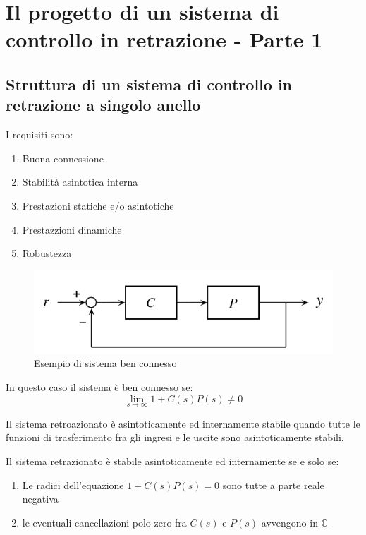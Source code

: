 \section{Il progetto di un sistema di controllo in retrazione - Parte 1}

\subsection{Struttura di un sistema di controllo in retrazione a singolo anello}
I requisiti sono:
\begin{enumerate}
  \item Buona connessione
  \item Stabilità asintotica interna
  \item Prestazioni statiche e/o asintotiche
  \item Prestazzioni dinamiche
  \item Robustezza
\end{enumerate}


\begin{figure}[h!]
  \centering
  \includegraphics[width=0.3\linewidth]{./images/guadagno_anello_esempio_ben_connesso.png}
  \caption{Esempio di sistema ben connesso}
  \label{fig:guadagno_anello_esempio_ben_connesso}
\end{figure}


In questo caso il sistema è ben connesso se:
\begin{equation}
  \lim_{s \to \infty} 1 + C(s)P(s) \neq 0
\end{equation}



\begin{definition}
  Il sistema retroazionato è asintoticamente ed internamente stabile quando
  tutte le funzioni di trasferimento fra gli ingresi e le uscite sono asintoticamente 
  stabili.

  Il sistema retrazionato è stabile asintoticamente ed internamente se e solo se:
  \begin{enumerate}
    \item Le radici dell'equazione $1 + C(s)P(s) = 0$ sono tutte a parte reale negativa
    \item le eventuali cancellazioni polo-zero fra $C(s)$ e $P(s)$ avvengono in $\mathbb{C_-}$
  \end{enumerate}
\end{definition}


